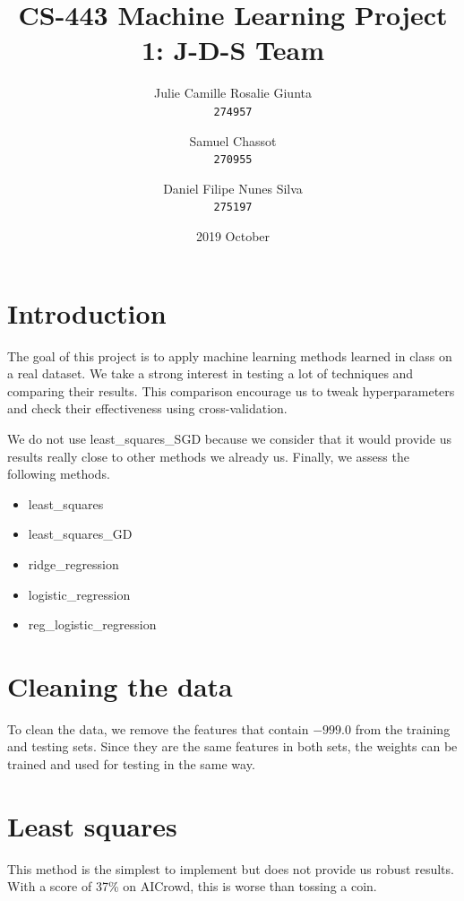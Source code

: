 \documentclass[11pt, a4paper, twoside]{article}
\begin{document}
\date{2019 October}
\title{CS-443 Machine Learning Project 1: J-D-S Team}
\author{
  Julie Camille Rosalie Giunta\\
  \texttt{274957}
  \and
  Samuel Chassot\\
  \texttt{270955}
  \and
  Daniel Filipe Nunes Silva\\
  \texttt{275197}
}

\maketitle
\clearpage

\section{Introduction}
The goal of this project is to apply machine learning
methods learned in class on a real dataset. We take a
strong interest in testing a lot of techniques and
comparing their results. This comparison encourage us to
tweak hyperparameters and check their effectiveness using
cross-validation.

We do not use least\_squares\_SGD because we consider
that it would provide us results really close to other
methods we already us. Finally, we assess the following
methods.

\begin{itemize}
  \item least\_squares
  \item least\_squares\_GD 
  \item ridge\_regression
  \item logistic\_regression
  \item reg\_logistic\_regression
\end{itemize}

\section{Cleaning the data}
To clean the data, we remove the features
that contain $-999.0$ from the training and testing sets. 
Since they are the same features in both sets, 
the weights can be trained and used for testing in the same way.

\section{Least squares}
This method is the simplest to implement but does not
provide us robust results. With a score of 37\% on
AICrowd, this is worse than tossing a coin.
\end{document}
